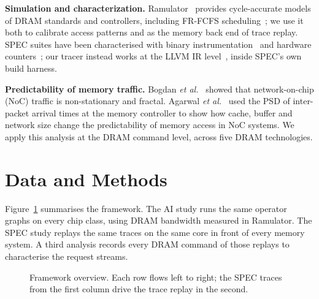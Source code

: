 \documentclass[12pt]{article}
\begin{document}
\textbf{Simulation and characterization.} Ramulator~\cite{kim2016,luo2024} provides cycle-accurate models of DRAM standards and controllers, including FR-FCFS scheduling~\cite{rixner2000}; we use it both to calibrate access patterns and as the memory back end of trace replay. SPEC suites have been characterised with binary instrumentation~\cite{luk2005} and hardware counters~\cite{limaye2018}; our tracer instead works at the LLVM IR level~\cite{lattner2004}, inside SPEC's own build harness.

\textbf{Predictability of memory traffic.} Bogdan \emph{et al.}~\cite{bogdan2010} showed that network-on-chip (NoC) traffic is non-stationary and fractal. Agarwal \emph{et al.}~\cite{agarwal2025} used the PSD of inter-packet arrival times at the memory controller to show how cache, buffer and network size change the predictability of memory access in NoC systems. We apply this analysis at the DRAM command level, across five DRAM technologies.
\newpage

\section{Data and Methods}\label{sec:methods}
Figure~\ref{fig:framework} summarises the framework. The AI study runs the same operator graphs on every chip class, using DRAM bandwidth measured in Ramulator. The SPEC study replays the same traces on the same core in front of every memory system. A third analysis records every DRAM command of those replays to characterise the request streams.

\begin{figure}[htbp]
\centering
{}
\caption{Framework overview. Each row flows left to right; the SPEC traces from the first column drive the trace replay in the second.}
\label{fig:framework}
\end{figure}
\end{document}
